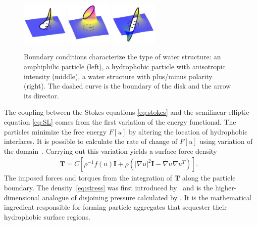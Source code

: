 \begin{figure}
  \vspace{-22pt}
  \includegraphics[width=0.2\textwidth]{figures/SpecificAim1/LPA.pdf}
  \includegraphics[width=0.2\textwidth]{figures/SpecificAim1/LPB.pdf}
  \includegraphics[width=0.2\textwidth]{figures/SpecificAim1/LPC.pdf}  
\caption{\label{fig:bcs} Boundary conditions characterize the type of
  water structure: an amphiphilic particle (left), a hydrophobic
  particle with anisotropic intensity (middle), a water structure with
  plus/minus polarity (right). The dashed curve is the boundary of the
  disk and the arrow its director.}
\end{figure}
The coupling between the Stokes equations \eqref{eq:stokes} and the
semilinear elliptic equation \eqref{eq:SL} comes from the first
variation of the energy functional. The particles minimize the free
energy $F[u]$ by altering the location of hydrophobic interfaces. It is
possible to calculate the rate of change of $F[u]$ using variation of
the domain~\cite{Bandle2015, Schiffer1954, Grinfeld2010}. Carrying out
this variation yields a 
surface force density 
\begin{align}
  \label{eq:stress}
\mathbf{T}
= C \left[ \rho^{-1} f(u) \mathbf{I}
  + \rho \left(|\nabla u|^2 \mathbf{I} - \nabla u \nabla u^T\right)\right].
\end{align}
The imposed forces and torques from the integration of $\mathbf{T}$
along the particle boundary. The density~\eqref{eq:stress} was first
introduced by~\cite{Fu2018_SIAM} and is the higher-dimensional analogue
of disjoining pressure calculated by \cite{MaRa76, ErLjCl89, KoNa15,
Nagle17, KUZMIN2005}. It is the mathematical ingredient responsible for
forming particle aggregates that sequester their hydrophobic surface
regions.

